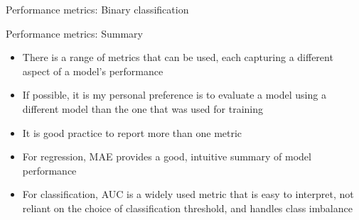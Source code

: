 \documentclass[10pt]{beamer}
\begin{document}
    \begin{frame}{Performance metrics: Binary classification}
        \centering
    \end{frame}

    \begin{frame}{Performance metrics: Summary}
        \begin{itemize}
            \item There is a range of metrics that can be used, each capturing a different aspect of a model's performance
            \item If possible, it is my personal preference is to evaluate a model using a different model than the one that was used for training
            \item It is good practice to report more than one metric
            \item For regression, MAE provides a good, intuitive summary of model performance
            \item For classification, AUC is a widely used metric that is easy to interpret, not reliant on the choice of classification threshold, and handles class imbalance
        \end{itemize}
    \end{frame}
\end{document}
